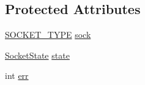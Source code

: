 \subsection*{Protected Attributes}
\begin{DoxyCompactItemize}
\item 
\hyperlink{namespacelog4cplus_1_1helpers_afe2a1567866b6a9e0bfd5d425c3323f2}{S\-O\-C\-K\-E\-T\-\_\-\-T\-Y\-P\-E} \hyperlink{classlog4cplus_1_1helpers_1_1AbstractSocket_af94ee3bfaba254e722bdd55429b61393}{sock}
\item 
\hyperlink{namespacelog4cplus_1_1helpers_ac57a089674b66ea982e43dff7ff1c78e}{Socket\-State} \hyperlink{classlog4cplus_1_1helpers_1_1AbstractSocket_a145f2db82d4ab080a5e114606b79b4c9}{state}
\item 
int \hyperlink{classlog4cplus_1_1helpers_1_1AbstractSocket_a26ff3fef10b1f1a6e50d41e78141bb4c}{err}
\end{DoxyCompactItemize}



